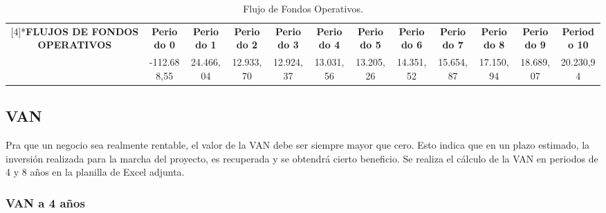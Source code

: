 \begin{table}[H]
  \tiny
  \centering
    \begin{tabular}{|c|c|c|c|c|c|c|c|c|c|c|c|}
    \hline
    \rowcolor[rgb]{ .773,  .851,  .945} \multirow{2}[4]{*}{\textbf{FLUJOS DE FONDOS OPERATIVOS}} & \cellcolor[rgb]{ 1,  1,  1}\textbf{Periodo 0} & \cellcolor[rgb]{ 1,  1,  1}\textbf{Periodo 1} & \cellcolor[rgb]{ 1,  1,  1}\textbf{Periodo 2} & \cellcolor[rgb]{ 1,  1,  1}\textbf{Periodo 3} & \cellcolor[rgb]{ 1,  1,  1}\textbf{Periodo 4} & \cellcolor[rgb]{ 1,  1,  1}\textbf{Periodo 5} & \cellcolor[rgb]{ 1,  1,  1}\textbf{Periodo 6} & \cellcolor[rgb]{ 1,  1,  1}\textbf{Periodo 7} & \cellcolor[rgb]{ 1,  1,  1}\textbf{Periodo 8} & \cellcolor[rgb]{ 1,  1,  1}\textbf{Periodo 9} & \cellcolor[rgb]{ 1,  1,  1}\textbf{Periodo 10} \bigstrut\\
\cline{2-12}    \rowcolor[rgb]{ .773,  .851,  .945}       & \cellcolor[rgb]{ 1,  1,  1}-112.688,55 & \cellcolor[rgb]{ 1,  1,  1}24.466,04 & \cellcolor[rgb]{ 1,  1,  1}12.933,70 & \cellcolor[rgb]{ 1,  1,  1}12.924,37 & \cellcolor[rgb]{ 1,  1,  1}13.031,56 & \cellcolor[rgb]{ 1,  1,  1}13.205,26 & \cellcolor[rgb]{ 1,  1,  1}14.351,52 & \cellcolor[rgb]{ 1,  1,  1}15.654,87 & \cellcolor[rgb]{ 1,  1,  1}17.150,94 & \cellcolor[rgb]{ 1,  1,  1}18.689,07 & \cellcolor[rgb]{ 1,  1,  1}20.230,94 \bigstrut\\
    \hline
    \end{tabular}%
     \caption{Flujo de Fondos Operativos.}
  \label{tab:flujo-fondos-operativos}%
\end{table}%





\subsection{VAN}

Pra que un negocio sea realmente rentable, el valor de la VAN debe ser siempre mayor que cero. Esto indica que en un plazo estimado, la inversión realizada para la marcha del proyecto, es recuperada y se obtendrá cierto beneficio. Se realiza el cálculo de la VAN en periodos de 4 y 8 años en la planilla de Excel adjunta.

\subsubsection{VAN a 4 años}

